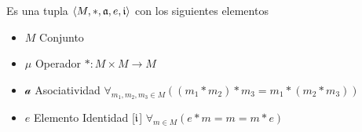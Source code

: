 \begin{note}

\end{note}

\begin{defn}[Monoide]
Es una tupla $\langle M, *, \mathfrak{a}, e, \mathfrak{i} \rangle$ con los siguientes elementos
\begin{itemize}
\item $M$ Conjunto
\item $\mu$ Operador $* : M \times M \to M$
\item $\mathcal{a}$ Asociatividad $\forall_{m_1, m_2, m_3 \in M} ((m_1 * m_2) * m_3 = m_1 * (m_2 * m_3))$
\item $e$ Elemento Identidad [$\mathfrak{i}$] $\forall_{m \in M} ( e * m = m = m * e)$
\end{itemize}
\end{defn}